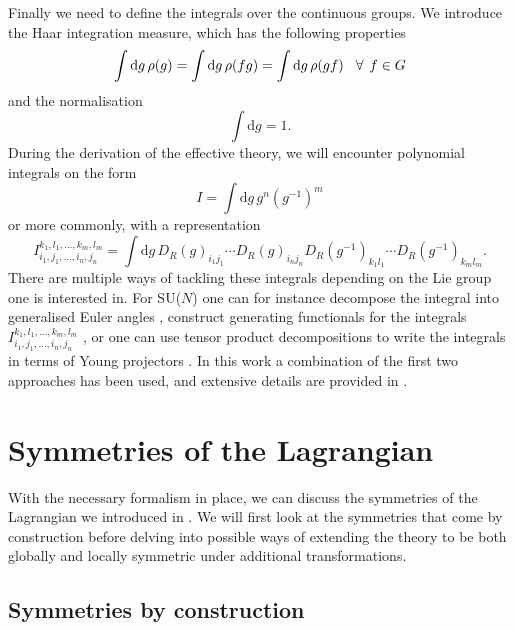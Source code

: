 Finally we need to define the integrals over the continuous groups. We introduce
the Haar integration measure, which has the following properties
%
\begin{equation}
  \int \mathrm{d}g \, \rho(g) = \int \mathrm{d}g \, \rho(fg) 
    = \int \mathrm{d}g \, \rho(gf) \hskip2ex \forall \hskip1ex f \in G
\end{equation}
%
and the normalisation
%
\begin{equation}
  \int \mathrm{d}g = 1.
\end{equation}
%
During the derivation of the effective theory, we will encounter polynomial
integrals on the form
%
\begin{equation}
  I = \int \mathrm{d} g \, g^n (g^{-1})^m
\end{equation}
%
or more commonly, with a representation
%
\begin{equation} \label{eq:group-integrals-representation}
  I_{i_1,j_1,...,i_n,j_n}^{k_1,l_1,...,k_m,l_m} = \int \mathrm{d} g \,
    D_R(g)_{i_1j_1} \cdots D_R(g)_{i_nj_n} D_R(g^{-1})_{k_1l_1} \cdots D_R(g^{-1})_{k_ml_m}.
\end{equation}
%
There are multiple ways of tackling these integrals depending on the Lie group
one is interested in. For SU($N$) one can for instance decompose the integral
into generalised Euler angles \citep[as described in][]{Tilma:2004kp}, construct
generating functionals for the integrals $I_{i_1,j_1,...,i_n,j_n}^{k_1,l_1,...,k_m,l_m}$
\citep[details in][]{Creutz:1978ub}, or one can use tensor product
decompositions to write the integrals in terms of Young projectors
\citep{Myers:2014dia}. In this work a combination of the first two approaches
has been used, and extensive details are provided in
.

\section{Symmetries of the Lagrangian} \label{sec:symmetries}

With the necessary formalism in place, we can discuss the symmetries of the
Lagrangian we introduced in . We will first look at the
symmetries that come by construction before delving into possible ways of
extending the theory to be both globally and locally symmetric under additional
transformations.

\subsection{Symmetries by construction}

